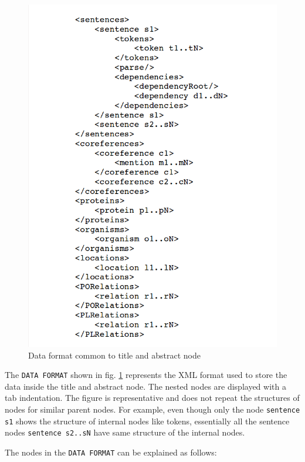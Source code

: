 \begin{enumerate}
\begin{figure}
\centering
\includegraphics[scale=0.4]{figures/XMLSchema2.png}
\caption{Data format common to title and abstract node}\label{fig:XMLSchema2}
\end{figure}

The \texttt{DATA FORMAT} shown in fig. \ref{fig:XMLSchema2} represents the XML format used to store the data inside the title and abstract node. The nested nodes are displayed with a tab indentation. The figure is representative and does not repeat the structures of nodes for similar parent nodes. For example, even though only the node \texttt{sentence s1} shows the structure of internal nodes like tokens, essentially all the sentence nodes \texttt{sentence s2..sN} have same structure of the internal nodes.

The nodes in the \texttt{DATA FORMAT} can be explained as follows:


\end{enumerate}
